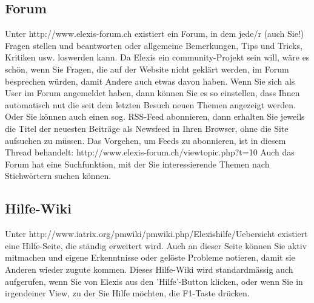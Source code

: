 \documentclass[a4paper]{scrartcl}
\begin{document}
\subsection{Forum}
Unter http://www.elexis-forum.ch existiert ein Forum, in dem jede/r (auch Sie!) Fragen stellen und beantworten oder allgemeine Bemerkungen, Tips und Tricks, Kritiken usw. loswerden kann. Da Elexis ein community-Projekt sein will, wäre es schön, wenn Sie Fragen, die auf der Website nicht geklärt werden, im Forum besprechen würden, damit Andere auch etwas davon haben.
Wenn Sie sich als User im Forum angemeldet haben, dann können Sie es so einstellen, dass Ihnen automatisch nut die seit dem letzten Besuch neuen Themen angezeigt werden. Oder Sie können auch einen sog. RSS-Feed abonnieren, dann erhalten Sie jeweils die Titel der neuesten Beiträge als Newsfeed in Ihren Browser, ohne die Site aufsuchen zu müssen. Das Vorgehen, um Feeds zu abonnieren, ist in diesem Thread behandelt: http://www.elexis-forum.ch/viewtopic.php?t=10
Auch das Forum hat eine Suchfunktion, mit der Sie interessierende Themen nach Stichwörtern suchen können.

\subsection{Hilfe-Wiki}
Unter http://www.iatrix.org/pmwiki/pmwiki.php/Elexishilfe/Uebersicht existiert eine Hilfe-Seite, die ständig erweitert wird. Auch an dieser Seite können Sie aktiv mitmachen und eigene Erkenntnisse oder gelöste Probleme notieren, damit sie Anderen wieder zugute kommen.
Dieses Hilfe-Wiki wird standardmässig auch aufgerufen, wenn Sie von Elexis aus den 'Hilfe'-Button klicken, oder wenn Sie in irgendeiner View, zu der Sie Hilfe möchten, die F1-Taste drücken.
\end{document}
